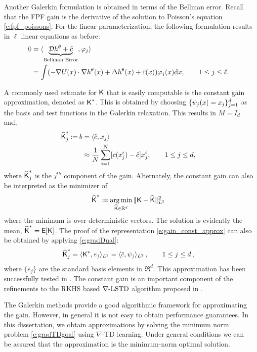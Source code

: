 Another Galerkin formulation is obtained in terms of the Bellman error. Recall that the FPF gain is the derivative of the solution to Poisson's equation \eqref{e:fpf_poissons}. For the linear parameterization, the following formulation results in $\ell$ linear equations as before:
\begin{equation}
\begin{aligned}
0 &= \langle \underbrace{\clD h^\param+\tilc}_{\text{Bellman Error}}, \test_{j} \rangle \\
&= \int (-\nabla U(x) \cdot \nabla h^\param(x)+ \Delta h^\param(x)+\tilc (x))\test_{j}(x) \ud x,  \qquad  1\leq j \leq \ell.
\end{aligned}
\label{e:fpf_galerkin_be}
\end{equation}

A commonly used estimate for $\text{\sf K}$ that is easily computable is the constant gain approximation, denoted as $\text{\sf K}^*$. This is obtained by choosing $\{\psi_j(x) = x_j\}_{j=1}^d$ as the basis and test functions in the Galerkin relaxation. This results in  $M = I_{d}$ and,
\begin{align}
\hakFPF^*_j \eqdef b & = \langle \tilc , x_j \rangle \\ 
& \approx \frac{1}{N} \sum_{i=1}^N [ c(x^i_j) - \hac ]x^i_j, \qquad 1 \leq j \leq d,
\label{e:gain_const_approx}
\end{align}
where $\widehat{\text{\sf K}}^*_j$ is the $j^{th}$ component of the gain.
Alternately, the constant gain can also be interpreted as the minimizer of 
  \begin{equation}
  \hakFPF^* \eqdef \argmin_{\hakFPF \in \Re^d} \| \kFPF - \hakFPF \|^2_{L^{2}}
  \label{e:fpf_const}
  \end{equation}
  where the minimum is over deterministic vectors. The solution is evidently the mean,  $\widehat{\text{\sf K}}^* = {\sf E}[\text{\sf K}]$.
The proof of the representation \eqref{e:gain_const_approx} can also be obtained by applying \eqref{e:gradDual}: 
\[
\widehat{\text{\sf K}}^*_ j =  \langle \text{\sf K}^* ,e_j \rangle_{L^2}
=
\langle \tilde c ,\psi_j \rangle_{L^2}\,, \qquad 1\le j\le d\,,
\]
where $\{e_j\}$ are the standard basis elements in $\Re^d$. This approximation has been successfully tested in \cite{tilghiomeh13}. The constant gain is an important component of the refinements to the RKHS based $\nabla\text{-LSTD}$ algorithm proposed in .

The Galerkin methods provide a good algorithmic framework for approximating the gain. However, in general it is not easy to obtain performance guarantees. In this dissertation, we obtain approximations by solving  the minimum norm problem \eqref{e:gradTDgoal} using $\nabla$-TD learning.  Under general conditions we can be assured that the approximation is the minimum-norm optimal solution.   

